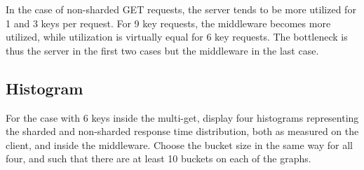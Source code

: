 \documentclass[11pt,a4paper]{article}
\begin{document}
In the case of non-sharded GET requests, the server tends to be more utilized for 1 and 3 keys per request. For 9 key requests, the middleware becomes more utilized, while utilization is virtually equal for 6 key requests. The bottleneck is thus the server in the first two cases but the middleware in the last case. 

\subsection{Histogram}

For the case with 6 keys inside the multi-get, display four histograms representing the sharded and non-sharded response time distribution, both as measured on the client, and inside the middleware. Choose the bucket size in the same way for all four, and such that there are at least 10 buckets on each of the graphs.
\end{document}
